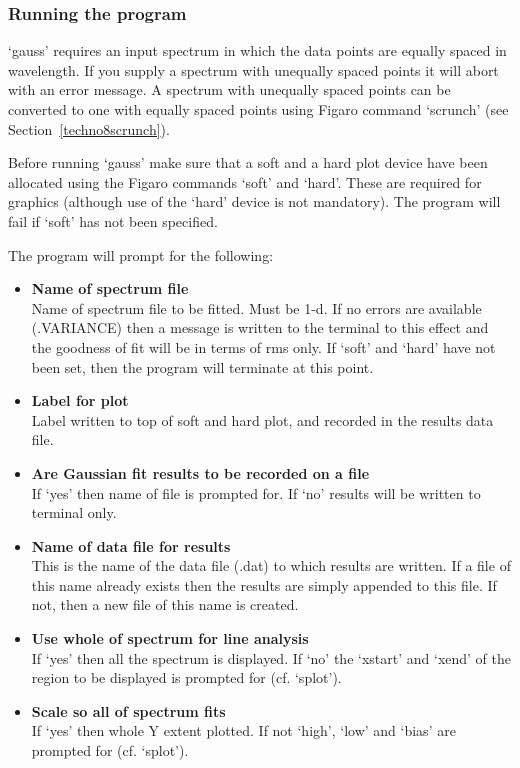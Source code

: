 
\subsubsection{\label{techno12running}Running the program}

   `gauss' requires an input spectrum in which the data points are
   equally spaced in wavelength.  If you supply a spectrum with
   unequally spaced points it will abort with an error message.  A
   spectrum with unequally spaced points can be converted to one with
   equally spaced points using Figaro command `scrunch' (see
   Section~\ref{techno8scrunch}).

   Before running `gauss' make sure that a soft and a hard plot device
   have been allocated using the Figaro commands `soft' and `hard'.
   These are required for graphics (although use of the `hard' device is
   not mandatory). The program will fail if `soft' has not been
   specified.

   The program will prompt for the following:

\begin{itemize}
\item{\bf Name of spectrum file}\ \\
   Name of spectrum file to be fitted. Must be 1-d. If no errors are
   available (.VARIANCE) then a message is written to the terminal to
   this effect and the goodness of fit will be in terms of rms only.
   If `soft' and `hard' have not been set, then the program will
   terminate at this point.
\item{\bf Label for plot}\ \\
   Label written to top of soft and hard plot, and recorded in the
   results data file.
\item{\bf Are Gaussian fit results to be recorded on a file}\ \\
   If `yes' then name of file is prompted for. If `no' results will be
   written to terminal only.
\item{\bf Name of data file for results}\ \\
   This is the name of the data file (.dat) to which results are
   written. If a file of this name already exists then the results are
   simply appended to this file. If not, then a new file of this name is
   created.
\item{\bf Use whole of spectrum for line analysis}\ \\
   If `yes' then all the spectrum is displayed. If `no' the `xstart' and
   `xend' of the region to be displayed is prompted for (cf. `splot').
\item{\bf Scale so all of spectrum fits}\ \\
   If `yes' then whole Y extent plotted. If not `high', `low' and `bias'
   are prompted for (cf. `splot').
\end{itemize}

